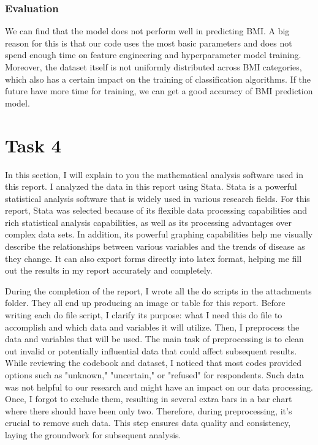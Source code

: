 \documentclass{article}
\begin{document}
\subsubsection{Evaluation}

We can find that the model does not perform well in predicting BMI. A big reason for this is that our code uses the most basic parameters and does not spend enough time on feature engineering and hyperparameter model training. Moreover, the dataset itself is not uniformly distributed across BMI categories, which also has a certain impact on the training of classification algorithms. If the future have more time for training, we can get a good accuracy of BMI prediction model.

\newpage
\section{Task 4}

In this section, I will explain to you the mathematical analysis software used in this report. I analyzed the data in this report using Stata. Stata is a powerful statistical analysis software that is widely used in various research fields. For this report, Stata was selected because of its flexible data processing capabilities and rich statistical analysis capabilities, as well as its processing advantages over complex data sets. In addition, its powerful graphing capabilities help me visually describe the relationships between various variables and the trends of disease as they change. It can also export forms directly into latex format, helping me fill out the results in my report accurately and completely.

During the completion of the report, I wrote all the do scripts in the attachments folder. They all end up producing an image or table for this report. Before writing each do file script, I clarify its purpose: what I need this do file to accomplish and which data and variables it will utilize. Then, I preprocess the data and variables that will be used. The main task of preprocessing is to clean out invalid or potentially influential data that could affect subsequent results. While reviewing the codebook and dataset, I noticed that most codes provided options such as "unknown," "uncertain," or "refused" for respondents. Such data was not helpful to our research and might have an impact on our data processing. Once, I forgot to exclude them, resulting in several extra bars in a bar chart where there should have been only two. Therefore, during preprocessing, it's crucial to remove such data. This step ensures data quality and consistency, laying the groundwork for subsequent analysis.
\end{document}
